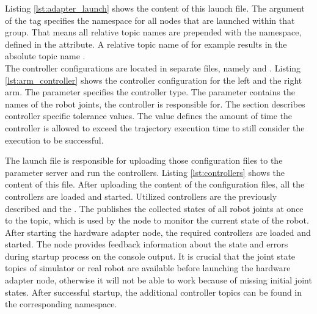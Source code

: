 

Listing \ref{lst:adapter_launch} shows the content of this launch file. The  argument of the  tag specifies the namespace for all nodes that are launched within that group. That means all relative topic names are prepended with the namespace, defined in the  attribute. A relative topic name of  for example results in the absolute topic name .\\

The controller configurations are located in separate files, namely  and . Listing \ref{lst:arm_controller} shows the controller configuration for the left and the right arm. The  parameter specifies the controller type. The  parameter contains the names of the robot joints, the controller is responsible for. The section  describes controller specific tolerance values. The  value defines the amount of time the controller is allowed to exceed the trajectory execution time to still consider the execution to be successful.



The launch file  is responsible for uploading those configuration files to the parameter server and run the controllers. Listing \ref{lst:controllers} shows the content of this file. After uploading the content of the configuration files, all the controllers are loaded and started.
Utilized controllers are the previously described  and the . The  publishes the collected states of all robot joints at once to the  topic, which is used by the  node to monitor the current state of the robot. \\



After starting the hardware adapter node, the required controllers are loaded and started. The node provides feedback information about the state and errors during startup process on the console output. It is crucial that the joint state topics of simulator or real robot are available before launching the hardware adapter node, otherwise it will not be able to work because of missing initial joint states. After successful startup, the additional controller topics can be found in the corresponding namespace.

